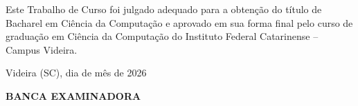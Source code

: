 \begin{folhadeaprovacao}

  \begin{center}
    \vspace*{-1.2cm}
    \textbf{\large\imprimirautor}

    \vspace*{\fill}\vspace*{\fill}\vspace*{\fill}

    \parbox{15cm}{
        \OnehalfSpacing
        \centering
        \large\textbf{\imprimirtitulo}
    }

    \vspace*{\fill}\vspace*{\fill}

    \hspace{.45\textwidth}
    \begin{minipage}{.5\textwidth}
        Este Trabalho de Curso foi julgado adequado para a obtenção
        do título de Bacharel em Ciência da Computação e aprovado em
        sua forma final pelo curso de graduação em Ciência da Computação
        do Instituto Federal Catarinense – Campus Videira.
    \end{minipage}

    \vspace*{\fill}
  \end{center}

  \vspace{-1cm}

  \begin{center}
    Videira (SC), dia de mês de 2026
  \end{center}


  \begin{center}
    \textbf{BANCA EXAMINADORA}
  \end{center}



  \vspace*{1cm}

\end{folhadeaprovacao}
